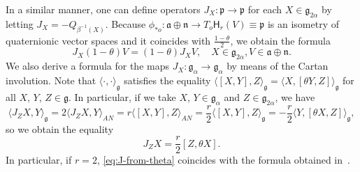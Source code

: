 \documentclass[12pt, a4paper,draft]{amsart}
\newcommand{\g}{\mathfrak}
\theoremstyle{remark}
\begin{document}
In a similar manner, one can define operators $J_{X}\colon \g{p}\to\g{p}$ for each $X\in\g{g}_{2\alpha}$ by letting $J_{X}=-Q_{\beta^{-1}(X)}$.
Because $\phi_{*o}\colon\g{a}\oplus\g{n}\to T_{o}\mathsf{H}_{r}(V)\equiv\g{p}$ is an isometry of quaternionic vector spaces and it coincides with $\frac{1-\theta}{2}$, we obtain the formula
\begin{equation*}
	J_{X}(1-\theta)V=(1-\theta)J_{X}V, \quad X\in\g{g}_{2\alpha},  V\in\g{a}\oplus\g{n}.
\end{equation*}
We also derive a formula for the maps $J_{X}\colon \g{g}_{\alpha}\to\g{g}_{\alpha}$ by means of the Cartan involution.
Note that $\langle\cdot,\cdot\rangle_{\g{g}}$ satisfies the equality $\langle[X,Y],Z\rangle_{\g{g}}=\langle X,[\theta Y,Z]\rangle_{\g{g}}$ for all $X$, $Y$, $Z\in\g{g}$.
In particular, if we take $X$, $Y\in \g{g}_{\alpha}$ and $Z\in\g{g}_{2\alpha}$, we have
\begin{equation*}
	\langle J_{Z}X,Y\rangle_{\g{g}}=2\langle J_{Z}X,Y\rangle_{AN}=r\langle [X,Y],Z\rangle_{AN}=\frac{r}{2}\langle[X,Y],Z\rangle_{\g{g}}=-\frac{r}{2}\langle Y,[\theta X,Z] \rangle_{\g{g}},
\end{equation*}
so we obtain the equality
\begin{equation}\label{eq:J-from-theta}
	J_{Z}X=\frac{r}{2}[Z,\theta X].
\end{equation}
In particular, if $r=2$, \eqref{eq:J-from-theta} coincides with the formula obtained in~\cite[Proposition~5.9]{CowlingDooleyKoranyiRicci}.
\end{document}
